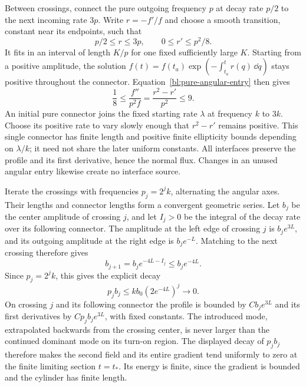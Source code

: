 Between crossings, connect the pure outgoing frequency $p$ at decay
rate $p/2$ to the next incoming rate $3p$.  Write $r=-f'/f$ and choose
a smooth transition, constant near its endpoints, such that
\[
 p/2\le r\le3p,\qquad 0\le r'\le p^2/8.
\]
It fits in an interval of length $K/p$ for one fixed sufficiently
large $K$.  Starting from a positive amplitude, the solution
$f(t)=f(t_a)\exp(-\int_{t_a}^t r(q)\,\dd q)$ stays positive throughout the
connector.  Equation~\eqref{bl:pure-angular-entry} then gives
\begin{equation}\label{bl:connector-ellipticity}
 \frac18\le\frac{f''}{p^2f}
       =\frac{r^2-r'}{p^2}\le9.
\end{equation}
An initial pure connector joins the fixed starting rate $\lambda$ at
frequency $k$ to $3k$.  Choose its positive rate to vary slowly enough
that $r^2-r'$ remains positive.  This single connector has finite
length and positive finite ellipticity bounds depending on
$\lambda/k$; it need not share the later uniform constants.  All
interfaces preserve the profile and its first derivative, hence the
normal flux.  Changes in an unused angular entry likewise create no
interface source.

Iterate the crossings with frequencies $p_j=2^j k$, alternating the
angular axes.  Their lengths and connector lengths form a convergent
geometric series.  Let $b_j$ be the center amplitude of crossing $j$,
and let $I_j>0$ be the integral of the decay rate over its following
connector.  The amplitude at the left edge of crossing $j$ is
$b_j e^{3L}$, and its outgoing amplitude at the right edge is
$b_j e^{-L}$.  Matching to the next crossing therefore gives
\begin{equation}\label{bl:amplitude-decay}
 b_{j+1}=b_j e^{-4L-I_j}\le b_j e^{-4L}.
\end{equation}
Since $p_j=2^jk$, this gives the explicit decay
\[
 p_jb_j\le kb_0(2e^{-4L})^j\longrightarrow0.
\]
On crossing $j$ and its following connector the profile is bounded by
$C b_j e^{3L}$ and its first derivatives by $C p_j b_j e^{3L}$,
with fixed constants.  The introduced mode, extrapolated backwards
from the crossing center, is never larger than the continued dominant
mode on its turn-on region.  The displayed decay of $p_jb_j$ therefore
makes the second field and its entire gradient tend uniformly to zero
at the finite limiting section $t=t_*$.  Its energy is finite, since
the gradient is bounded and the cylinder has finite length.

